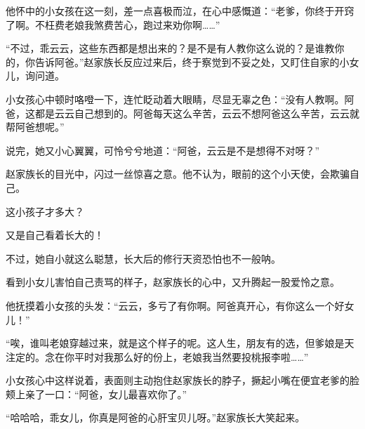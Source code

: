 \begin{this_body}
他怀中的小女孩在这一刻，差一点喜极而泣，在心中感慨道：“老爹，你终于开窍了啊。不枉费老娘我煞费苦心，跑过来劝你啊……”

“不过，乖云云，这些东西都是想出来的？是不是有人教你这么说的？是谁教你的，你告诉阿爸。”赵家族长反应过来后，终于察觉到不妥之处，又盯住自家的小女儿，询问道。

小女孩心中顿时咯噔一下，连忙眨动着大眼睛，尽显无辜之色：“没有人教啊。阿爸，这都是云云自己想到的。阿爸每天这么辛苦，云云不想阿爸这么辛苦，云云就帮阿爸想呢。”

说完，她又小心翼翼，可怜兮兮地道：“阿爸，云云是不是想得不对呀？”

赵家族长的目光中，闪过一丝惊喜之意。他不认为，眼前的这个小天使，会欺骗自己。

这小孩子才多大？

又是自己看着长大的！

不过，她自小就这么聪慧，长大后的修行天资恐怕也不一般呐。

看到小女儿害怕自己责骂的样子，赵家族长的心中，又升腾起一股爱怜之意。

他抚摸着小女孩的头发：“云云，多亏了有你啊。阿爸真开心，有你这么一个好女儿！”

“唉，谁叫老娘穿越过来，就是这个样子的呢。这人生，朋友有的选，但爹娘是天注定的。念在你平时对我那么好的份上，老娘我当然要投桃报李啦……”

小女孩心中这样说着，表面则主动抱住赵家族长的脖子，撅起小嘴在便宜老爹的脸颊上亲了一口：“阿爸，女儿最喜欢你了。”

“哈哈哈，乖女儿，你真是阿爸的心肝宝贝儿呀。”赵家族长大笑起来。

\end{this_body}

